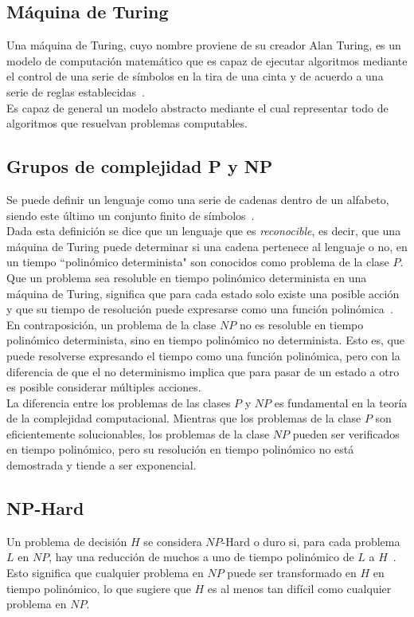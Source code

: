 \subsection{Máquina de Turing}
Una máquina de Turing, cuyo nombre proviene de su creador Alan Turing, es un modelo de computación matemático que es capaz de ejecutar algoritmos mediante el control de una serie de símbolos en la tira de una cinta y de acuerdo a una serie de reglas establecidas~\cite{stone1972}.\\[6pt]
Es capaz de general un modelo abstracto mediante el cual representar todo de algoritmos que resuelvan problemas computables.

\subsection{Grupos de complejidad P y NP}\label{complexity}
Se puede definir un lenguaje como una serie de cadenas dentro de un alfabeto, siendo este último un conjunto finito de símbolos~\cite{johnjeffery_automata}. \\[6pt]
Dada esta definición se dice que un lenguaje que es \textit{reconocible}, es decir, que una máquina de Turing puede determinar si una cadena pertenece al lenguaje o no, en un tiempo ``polinómico determinista" son conocidos como problema de la clase $P$. Que un problema sea resoluble en tiempo polinómico determinista en una máquina de Turing, significa que para cada estado solo existe una posible acción y que su tiempo de resolución puede expresarse como una función polinómica~\cite{johnjeffery_automata}. \\[6pt]
En contraposición, un problema de la clase $NP$ no es resoluble en tiempo polinómico determinista, sino en tiempo polinómico no determinista. Esto es, que puede resolverse expresando el tiempo como una función polinómica, pero con la diferencia de que el no determinismo implica que para pasar de un estado a otro es posible considerar múltiples acciones.\\[6pt]
La diferencia entre los problemas de las clases $P$ y $NP$ es fundamental en la teoría de la complejidad computacional. Mientras que los problemas de la clase $P$ son eficientemente solucionables, los problemas de la clase $NP$ pueden ser verificados en tiempo polinómico, pero su resolución en tiempo polinómico no está demostrada y tiende a ser exponencial.

\subsection{NP-Hard}
Un problema de decisión $H$ se considera $NP$-Hard o duro si, para cada problema $L$ en $NP$, hay una reducción de muchos a uno de tiempo polinómico de $L$ a $H$~\cite{leeuwen_algorithms_1998,johnjeffery_automata}. Esto significa que cualquier problema en $NP$ puede ser transformado en $H$ en tiempo polinómico, lo que sugiere que $H$ es al menos tan difícil como cualquier problema en $NP$.

